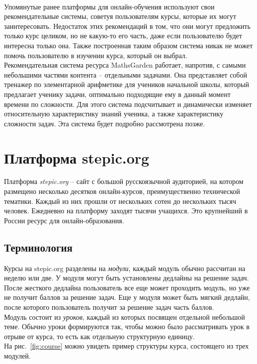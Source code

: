 \documentclass[14pt]{matmex-diploma}
\begin{document}
\\\indent Упомянутые ранее платформы для онлайн-обучения используют свои рекомендательные системы, советуя пользователям курсы, которые их могут заинтересовать. Недостаток этих рекомендаций в том, что они могут предложить только курс целиком, но не какую-то его часть, даже если пользователю будет интересна только она. Также построенная таким образом система никак не может помочь пользователю в изучении курса, который он выбрал.
\\\indent Рекомендательная система ресурса MathsGarden\cite{mathsgarden} работает, напротив, с самыми небольшими частями контента -- отдельными задачами. Она представляет собой тренажер по элементарной арифметике для учеников начальной школы, который предлагает ученику задачи, оптимально подходящие ему в данный момент времени по сложности. Для этого система подсчитывает и динамически изменяет относительную характеристику знаний ученика, а также характеристику сложности задач. Эта система будет подробно рассмотрена позже.


\section{Платформа stepic.org}
\indent Платформа \textit{stepic.org}\cite{stepic} -- сайт с большой русскоязычной аудиторией, на котором размещено несколько десятков онлайн-курсов, преимущественно технической тематики. Каждый из них прошли от нескольких сотен до нескольких тысяч человек. Ежедневно на платформу заходят тысячи учащихся. Это крупнейший в России ресурс для онлайн-образования.
\subsection{Терминология}
\indent Курсы на stepic.org разделены на \textit{модули}, каждый модуль обычно рассчитан на неделю или две. У модуля могут быть установлены дедлайны на решение задач. После жесткого дедлайна пользователь все еще может проходить модуль, но уже не получит баллов за решение задач. Еще у модуля может быть мягкий дедлайн, после которого пользователь получит за решение задач часть баллов.
\\\indent Модуль состоит из \textit{уроков}, каждый из которых посвящен отдельной небольшой теме. Обычно уроки формируются так, чтобы можно было рассматривать урок в отрыве от курса, то есть как отдельную структурную единицу.
\\\indent На рис.~\ref{fig:course} можно увидеть пример структуры курса, состоящего из трех модулей.
\end{document}
